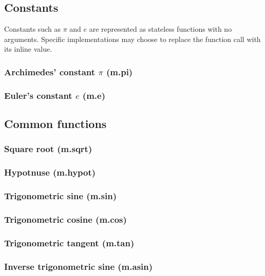 \documentclass{article}
\theoremstyle{definition}
\begin{document}
\subsection{Constants}

Constants such as $\pi$ and $e$ are represented as stateless functions with no arguments.  Specific implementations may choose to replace the function call with its inline value.

\subsubsection{Archimedes' constant $\pi$ (m.pi)}

\subsubsection{Euler's constant $e$ (m.e)}

\subsection{Common functions}

\subsubsection{Square root (m.sqrt)}

\subsubsection{Hypotnuse (m.hypot)}

\subsubsection{Trigonometric sine (m.sin)}

\subsubsection{Trigonometric cosine (m.cos)}

\subsubsection{Trigonometric tangent (m.tan)}

\subsubsection{Inverse trigonometric sine (m.asin)}
\end{document}
